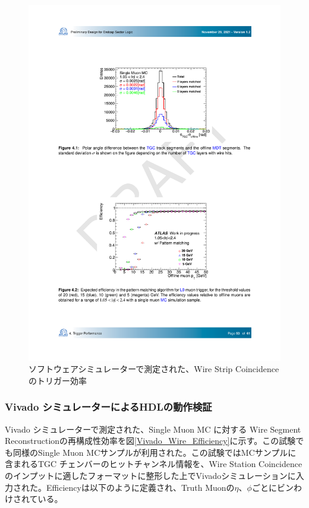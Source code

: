\begin{figure} 
    \centering
    \includegraphics[width=16cm]{fig/Test/Soft_WS.pdf}
    \caption[ソフトウェアシミュレーターで測定された、Wire Strip Coincidenceのトリガー効率]{ソフトウェアシミュレーターで測定された、Wire Strip Coincidenceのトリガー効率\cite{SLPDR}}
    \label{Soft_WS}
\end{figure}

\subsubsection*{Vivado シミュレーターによるHDLの動作検証}
Vivado シミュレーターで測定された、Single Muon  MC に対する Wire Segment Reconstructionの再構成性効率を図\ref{Vivado_Wire_Efficiency}に示す。この試験でも同様のSingle Muon MCサンプルが利用された。この試験ではMCサンプルに含まれるTGC チェンバーのヒットチャンネル情報を、Wire Station Coincidenceのインプットに適したフォーマットに整形した上でVivadoシミュレーションに入力された。Efficiencyは以下のように定義され、Truth Muonの$\eta$、$\phi$ごとにビンわけされている。

